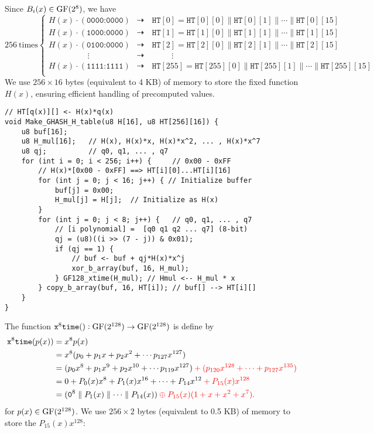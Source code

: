 \newpage
Since $B_i(x)\in\normalfont\text{GF}(2^8)$, we have \[
256\ \text{times} \begin{cases}
	H(x) \cdot (\texttt{0000:0000}) & \dashrightarrow\quad\texttt{HT}[0]=\texttt{HT}[0][0]\parallel\texttt{HT}[0][1]\parallel\cdots\parallel\texttt{HT}[0][15] \\
	H(x) \cdot (\texttt{1000:0000}) & \dashrightarrow\quad\texttt{HT}[1]=\texttt{HT}[1][0]\parallel\texttt{HT}[1][1]\parallel\cdots\parallel\texttt{HT}[1][15] \\
	H(x) \cdot (\texttt{0100:0000}) & \dashrightarrow\quad\texttt{HT}[2]=\texttt{HT}[2][0]\parallel\texttt{HT}[2][1]\parallel\cdots\parallel\texttt{HT}[2][15] \\
	\hspace{2cm}\vdots & \dashrightarrow\quad \hspace{1cm}\vdots \\
	H(x) \cdot (\texttt{1111:1111}) & \dashrightarrow\quad\texttt{HT}[255]=\texttt{HT}[255][0]\parallel\texttt{HT}[255][1]\parallel\cdots\parallel\texttt{HT}[255][15] \\
\end{cases}
\] We use $256\times 16$ bytes (equivalent to 4 KB) of memory to store the fixed function 
$H(x)$, ensuring efficient handling of precomputed values.
\vfill
\begin{lstlisting}[style=C]
// HT[q(x)][] <- H(x)*q(x) 
void Make_GHASH_H_table(u8 H[16], u8 HT[256][16]) {
	u8 buf[16];
	u8 H_mul[16]; 	// H(x), H(x)*x, H(x)*x^2, ... , H(x)*x^7
	u8 qj; 			// q0, q1, ... , q7
	for (int i = 0; i < 256; i++) { 	// 0x00 - 0xFF
		// H(x)*[0x00 - 0xFF] ==> HT[i][0]...HT[i][16]
		for (int j = 0; j < 16; j++) { // Initialize buffer
			buf[j] = 0x00;
			H_mul[j] = H[j];  // Initialize as H(x)
		}
		for (int j = 0; j < 8; j++) { 	// q0, q1, ... , q7
			// [i polynomial] =  [q0 q1 q2 ... q7] (8-bit)
			qj = (u8)((i >> (7 - j)) & 0x01);
			if (qj == 1) {
				// buf <- buf + qj*H(x)*x^j
				xor_b_array(buf, 16, H_mul); 
			} GF128_xtime(H_mul); // Hmul <-- H_mul * x 
		} copy_b_array(buf, 16, HT[i]); // buf[] --> HT[i][]
	}
}
\end{lstlisting}
\vfill
The function $\texttt{x$^8$time}():\normalfont\text{GF}(2^{128})\to\normalfont\text{GF}(2^{128})$ is define by \begin{align*}
	\texttt{x$^8$time}(p(x))&=x^8p(x)\\
	&=x^8(p_0+p_1x+p_2x^2+\cdots p_{127}x^{127}) \\
	&=(p_0x^8+p_1x^9+p_2x^{10}+\cdots p_{119}x^{127})\color{red}+(p_{120}x^{128}+\cdots+p_{127}x^{135})\\
	&=0+P_0(x)x^8+P_1(x)x^{16}+\cdots+P_{14}x^{12}\color{red}+P_{15}(x)x^{128}\\
	&=(\texttt{0}^8\parallel{P_1(x)}\parallel\cdots\parallel{P_{14}(x)}) \color{red}\oplus P_{15}(x)(1+x+x^2+x^7).
\end{align*} for $p(x)\in\normalfont\text{GF}(2^{128})$. We use $256\times 2$ bytes (equivalent to 0.5 KB) of memory to store the $P_{15}(x) x^{128}$:
